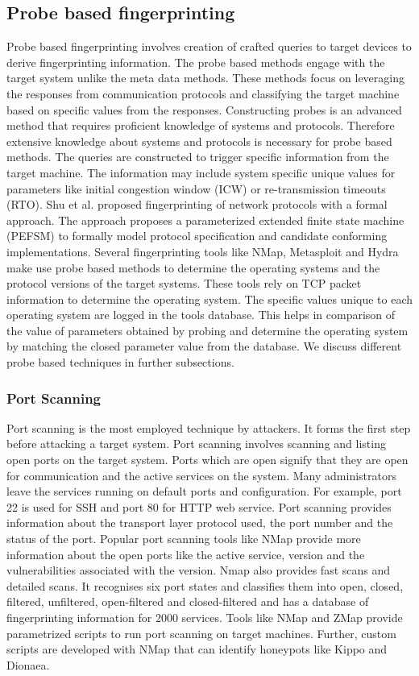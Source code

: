\documentclass[letterpaper, 10 pt, conference]{ieeeconf}  %
\begin{document}
\subsection{Probe based fingerprinting}
Probe based fingerprinting involves creation of crafted queries to target devices to derive fingerprinting information. The probe based methods engage with  the target system unlike the meta data methods. These methods focus on leveraging the responses from communication protocols and classifying the target machine based on specific values from the responses. Constructing probes is an advanced method that requires proficient knowledge of systems and protocols. Therefore extensive knowledge about systems and protocols is necessary for probe based methods. The queries are constructed to trigger specific information from the target machine. The information may include system specific unique values for parameters like initial congestion window (ICW) or re-transmission timeouts (RTO). 
Shu et al.\cite{shu2006network} proposed fingerprinting of network protocols with a formal approach. The approach proposes a parameterized extended finite state machine (PEFSM) to formally model protocol specification and candidate conforming implementations. Several fingerprinting tools like NMap, Metasploit and Hydra make use probe based  methods to determine the operating systems and the protocol versions of the target systems. These tools rely on TCP packet information to determine the operating system. The specific values unique to each operating system are logged in  the tools database. This helps in comparison of the value of parameters obtained by probing and determine the operating system by matching the closed parameter value from the database. We discuss different probe based techniques in further subsections. 
\newline

\subsubsection{Port Scanning}
Port scanning is the most employed technique by attackers. It forms the first step before attacking a target system. Port scanning involves scanning and listing open ports on the target system. Ports which are open signify that they are open for communication and the active services on the system. Many administrators leave the services running on default ports and configuration. For example, port 22 is used for SSH and port 80 for HTTP web service. Port scanning provides information about the transport layer protocol used, the port number and the status of the port. Popular port scanning tools like NMap\cite{NMap} provide more information about the open ports like the active service, version and the vulnerabilities associated with the version. Nmap also provides fast scans and detailed scans. It recognises six port states and classifies them into open, closed, filtered, unfiltered, open-filtered and closed-filtered and has a database of fingerprinting information for 2000 services. 
Tools like NMap and ZMap \cite{zmap} provide parametrized scripts to run port scanning on target machines. Further, custom scripts are developed with NMap that can identify honeypots like Kippo and Dionaea.  
\newline
\end{document}
